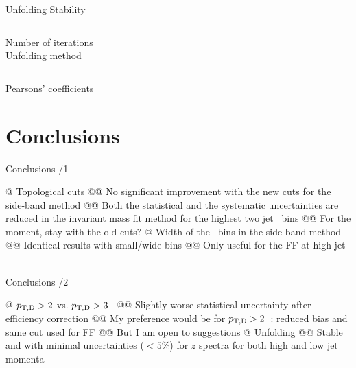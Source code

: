 \documentclass[xcolor={usenames,dvipsnames}]{beamer}
\begin{document}
\begin{frame}{Unfolding Stability}
\begin{columns}
\centering
\tiny 
Number of iterations\\
\centering
\tiny
Unfolding method\\
\end{columns}
\centering
\tiny
Pearsons' coefficients\\
\end{frame}

\section{Conclusions}

\begin{frame}[fragile]{Conclusions /1}
\begin{easylist}[itemize]
@ Topological cuts
@@ No significant improvement with the new cuts for the side-band method
@@ Both the statistical and the systematic uncertainties are reduced in the invariant mass fit method for the highest two jet \pt\ bins
@@ For the moment, stay with the old cuts?
@ Width of the \ptd\ bins in the side-band method
@@ Identical results with small/wide bins
@@ Only useful for the FF at high jet \pt\
\end{easylist}
\end{frame}

\begin{frame}[fragile]{Conclusions /2}
\begin{easylist}[itemize]
@ $p_{\mathrm{T,D}}>2$ vs. $p_{\mathrm{T,D}}>3$~\GeVc
@@ Slightly worse statistical uncertainty after efficiency correction
@@ My preference would be for $p_{\mathrm{T,D}}>2$~\GeVc: reduced bias and same cut used for FF
@@ But I am open to suggestions
@ Unfolding
@@ Stable and with minimal uncertainties ($<5$\%) for $z$ spectra for both high and low jet momenta
\end{easylist}
\end{frame}
\end{document}
